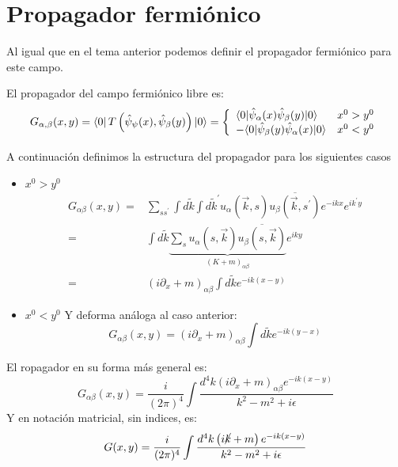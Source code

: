 \section{Propagador fermiónico}
Al igual que en el tema anterior podemos definir el propagador fermiónico para este campo. 

\begin{definition}
  El propagador del campo fermiónico libre es:
  $$
G_{\alpha, \beta}(x, y)=\bra{0} T\left(\hat{\psi}_\psi(x), \hat{\psi}_\beta(y)\right)\ket{0}=\left\{\begin{array}{ll}
\langle 0| \hat{\psi}_\alpha(x) \hat{\psi}_\beta(y)|0\rangle & x^0> y^0 \\
-\langle 0| \hat{\psi}_\beta(y) \hat{\psi}_\alpha(x)|0\rangle & x^0<y^0
\end{array}\right.
$$
\end{definition}

A continuación definimos la estructura del propagador para los siguientes casos
\begin{itemize}
  \item $ x^0> y^0$
  $$\begin{array}{ll}
    G_{\alpha \beta}(x, y)= & \sum_{s s^{\prime}} \int d \tilde{k} \int d \tilde{k}^{\prime} u_\alpha(\vec{k}, s) \overline{u_\beta\left(\vec{k},s^{\prime}\right)} e^{-i k x} e^{i k^{\prime} y}\\
    =&\int d \tilde{k} \underbrace{\sum_s u_\alpha(s , \vec{k}) \overline{u_\beta(s, \vec{k})} }_{(K+m)_{\alpha \beta}}e^{i k y}\\
    =&\left(i \partial_x+m\right)_{\alpha \beta} \int d \tilde{k} e^{-i k(x-y)}
  \end{array}$$
  
  \item  $ x^0< y^0$
  Y deforma análoga al caso anterior:
  $$
  G_{\alpha \beta}(x, y)=\left(i \partial_x+m\right)_{\alpha \beta} \int d \tilde{k} e^{-i k(y-x)}
$$
\end{itemize}

El ropagador en su forma más general es:
$$
G_{\alpha \beta}(x, y)=\frac{i}{(2 \pi)^4} \int \frac{d^4 k\left(i \partial_x+m\right)_{\alpha \beta} e^{-i k(x-y)}}{k^2-m^2+i \epsilon}
$$
Y en notación matricial, sin indices, es:
$$
G(x, y)=\frac{i}{(2 \pi)^4} \int \frac{d^4 k\left(i \cancel{k}+m\right) e^{-i k(x-y)}}{k^2-m^2+i \epsilon}
$$